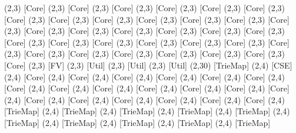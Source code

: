 {(2,3) [Core] %
(2,3) [Core] %
(2,3) [Core] %
(2,3) [Core] %
(2,3) [Core] %
(2,3) [Core] %
(2,3) [Core] %
(2,3) [Core] %
(2,3) [Core] %
(2,3) [Core] %
(2,3) [Core] %
(2,3) [Core] %
(2,3) [Core] %
(2,3) [Core] %
(2,3) [Core] %
(2,3) [Core] %
(2,3) [Core] %
(2,3) [Core] %
(2,3) [Core] %
(2,3) [Core] %
(2,3) [Core] %
(2,3) [Core] %
(2,3) [Core] %
(2,3) [Core] %
(2,3) [Core] %
(2,3) [Core] %
(2,3) [Core] %
(2,3) [Core] %
(2,3) [Core] %
(2,3) [Core] %
(2,3) [Core] %
(2,3) [Core] %
(2,3) [Core] %
(2,3) [FV] %
(2,3) [Util] %
(2,3) [Util] %
(2,3) [Util] %
(2,30) [TrieMap] %
(2,4) [CSE] %
(2,4) [Core] %
(2,4) [Core] %
(2,4) [Core] %
(2,4) [Core] %
(2,4) [Core] %
(2,4) [Core] %
(2,4) [Core] %
(2,4) [Core] %
(2,4) [Core] %
(2,4) [Core] %
(2,4) [Core] %
(2,4) [Core] %
(2,4) [Core] %
(2,4) [Core] %
(2,4) [Core] %
(2,4) [Core] %
(2,4) [Core] %
(2,4) [Core] %
(2,4) [Core] %
(2,4) [TrieMap] %
(2,4) [TrieMap] %
(2,4) [TrieMap] %
(2,4) [TrieMap] %
(2,4) [TrieMap] %
(2,4) [TrieMap] %
(2,4) [TrieMap] %
(2,4) [TrieMap] %
(2,4) [TrieMap] %
(2,4) [TrieMap] %
}
